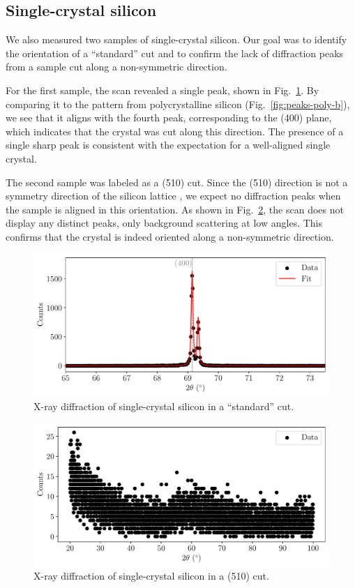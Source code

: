\documentclass{../paper}
\newcommand{\fig}[1]{Fig.~#1}
\begin{document}
\subsection{Single-crystal silicon}

We also measured two samples of single-crystal silicon. Our goal was to identify the orientation of a ``standard'' cut and to confirm the lack of diffraction peaks from a sample cut along a non-symmetric direction.

For the first sample, the scan revealed a single peak, shown in \fig{\ref{fig:peaks-single-std}}. By comparing it to the pattern from polycrystalline silicon (\fig{\ref{fig:peaks-poly-b}}), we see that it aligns with the fourth peak, corresponding to the (400) plane, which indicates that the crystal was cut along this direction. The presence of a single sharp peak is consistent with the expectation for a well-aligned single crystal.

The second sample was labeled as a (510) cut. Since the (510) direction is not a symmetry direction of the silicon lattice \cite{Si}, we expect no diffraction peaks when the sample is aligned in this orientation. As shown in \fig{\ref{fig:peaks-single-510}}, the scan does not display any distinct peaks, only background scattering at low angles. This confirms that the crystal is indeed oriented along a non-symmetric direction.

\begin{figure}
  \centering
  \includegraphics[width=\columnwidth]{analysis/peaks-Si_single_crystal-std.pdf}
  \caption{X-ray diffraction of single-crystal silicon in a ``standard'' cut.}
  \label{fig:peaks-single-std}
\end{figure}

\begin{figure}
  \centering
  \includegraphics[width=\columnwidth]{analysis/peaks-Si_single_crystal-510.pdf}
  \caption{X-ray diffraction of single-crystal silicon in a (510) cut.}
  \label{fig:peaks-single-510}
\end{figure}
\end{document}
